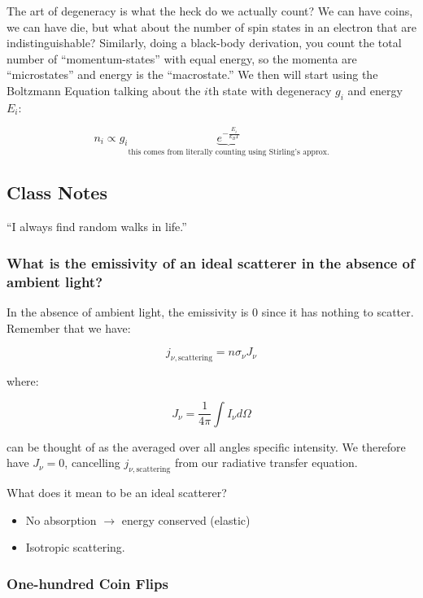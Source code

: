 \documentclass{article}
\begin{document}
The art of degeneracy is what the heck do we actually count? We can have coins, we can have die, but what about the number of spin states in an electron that are indistinguishable? Similarly, doing a black-body derivation, you count the total number of ``momentum-states'' with equal energy, so the momenta are ``microstates'' and energy is the ``macrostate.'' We then will start using the Boltzmann Equation talking about the $i$th state with degeneracy $g_i$ and energy $E_i$:

\begin{equation}
    n_i \propto g_i \underbrace{e^{-\frac{E_i}{k_B T}}}_{\text{this comes from literally counting using Stirling's approx.}}
\end{equation}

\subsection{Class Notes}

``I always find random walks in life.''

\subsubsection{What is the emissivity of an ideal scatterer in the absence of ambient light?}

In the absence of ambient light, the emissivity is $0$ since it has nothing to scatter.  Remember that we have:

\begin{equation}
    j_{\nu, \text{scattering}} = n \sigma_\nu J_\nu
\end{equation}

where:

\begin{equation}
    J_\nu = \frac{1}{4\pi} \int I_\nu d\Omega
\end{equation}

can be thought of as the averaged over all angles specific intensity. We therefore have $J_\nu = 0$, cancelling $j_{\nu, \text{scattering}}$ from our radiative transfer equation.

What does it mean to be an ideal scatterer?
\begin{itemize}
    \item No absorption $\rightarrow$ energy conserved (elastic)
    \item Isotropic scattering.
\end{itemize}

\subsubsection{One-hundred Coin Flips}
\end{document}
